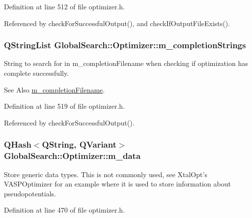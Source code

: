 Definition at line 512 of file optimizer.\-h.



Referenced by check\-For\-Successful\-Output(), and check\-If\-Output\-File\-Exists().

\hypertarget{classGlobalSearch_1_1Optimizer_a65ee33ee8778c366e8b197e75ae8e674}{
\subsubsection[{m\-\_\-completion\-Strings}]{\setlength{\rightskip}{0pt plus 5cm}Q\-String\-List Global\-Search\-::\-Optimizer\-::m\-\_\-completion\-Strings\hspace{0.3cm}{\ttfamily [protected]}}}\label{classGlobalSearch_1_1Optimizer_a65ee33ee8778c366e8b197e75ae8e674}
String to search for in m\-\_\-completion\-Filename when checking if optimization has complete successfully. \begin{DoxySeeAlso}{See Also}
\hyperlink{classGlobalSearch_1_1Optimizer_a5e7a476823bc2d4b63939a9ada4f8ed0}{m\-\_\-completion\-Filename}. 
\end{DoxySeeAlso}


Definition at line 519 of file optimizer.\-h.



Referenced by check\-For\-Successful\-Output().

\hypertarget{classGlobalSearch_1_1Optimizer_a5cf732e34a6eaa4a7b1781d23e6e1c6e}{
\subsubsection[{m\-\_\-data}]{\setlength{\rightskip}{0pt plus 5cm}Q\-Hash$<$Q\-String, Q\-Variant$>$ Global\-Search\-::\-Optimizer\-::m\-\_\-data\hspace{0.3cm}{\ttfamily [protected]}}}\label{classGlobalSearch_1_1Optimizer_a5cf732e34a6eaa4a7b1781d23e6e1c6e}
Store generic data types. This is not commonly used, see Xtal\-Opt's V\-A\-S\-P\-Optimizer for an example where it is used to store information about pseudopotentials. 

Definition at line 470 of file optimizer.\-h.



